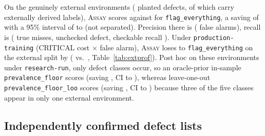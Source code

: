 \documentclass[11pt]{article}
\newcommand{\assay}{\textsc{Assay}}
\newcommand{\fe}{\texttt{flag\_everything}}
\newcommand{\pf}{\texttt{prevalence\_floor}}
\begin{document}
\begin{table}[t]\centering\footnotesize

\caption{Expected loss by authorship provenance under \texttt{research-run}. The in-process split is
asserted exact by unit tests on its \nFixtures{} fixtures (its loss is the twelve false alarms on
the three authored no-answer environments).}
\label{tab:splits}
\end{table}

On the \nExternal{} genuinely external environments (\nExtPlanted{} planted defects, of which
\nPlantedExtDerived{} carry externally derived labels), \assay{} scores \extLossAssay{} against
\extLossFloor{} for \fe{}, a saving of \extSaved{} with a 95\% interval of \extLoSaved{} to
\extHiSaved{} (not separated). Precision there is \extPrec{} (\extSpur{} false alarms), recall is
\extRec{} (\extMiss{} true misses, \extUnchecked{} unchecked defect, checkable recall
\extRecChecked{}). Under \texttt{production-training} (CRITICAL cost \prodRatio{}$\times$ false
alarm), \assay{} loses to \fe{} on the external split by \extProdDelta{} (\extProdAssay{} vs.\
\extProdFloor{}, Table~\ref{tab:extprof}). Post hoc on these \nExternal{} environments under
\texttt{research-run}, only \extPrevPresentClasses{} defect classes occur, so an oracle-prior
in-sample \pf{} scores \extLossPrev{} (saving \extSavedPrev{}, CI \extLoSavedPrev{} to
\extHiSavedPrev{}), whereas leave-one-out \texttt{prevalence\_floor\_loo} scores \extLossPrevLoo{}
(saving \extSavedPrevLoo{}, CI \extLoSavedPrevLoo{} to \extHiSavedPrevLoo{}) because three of the
five classes appear in only one external environment.

\begin{table}[t]\centering\small

\caption{Expected loss on the \nExternal{} genuinely external environments across all four cost
profiles. Bootstrap intervals are computed for \texttt{research-run}; other profiles show points.}
\label{tab:extprof}
\end{table}

\subsection{Independently confirmed defect lists}
\label{sec:external}
\end{document}
